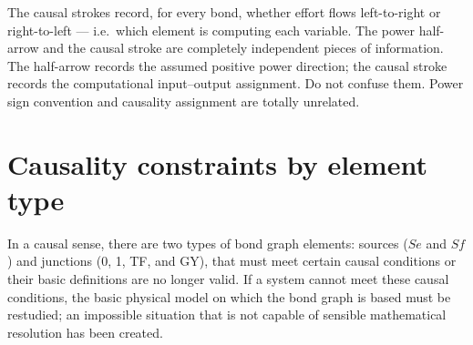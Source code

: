The causal strokes record, for every bond, whether effort flows left-to-right or right-to-left — i.e.\ which element is computing each variable. The power half-arrow and the causal stroke are completely independent pieces of information. The half-arrow records the assumed positive power direction; the causal stroke records the computational input--output assignment. Do not confuse them. Power sign convention and causality assignment are totally unrelated.

\section{Causality constraints by element type}

In a causal sense, there are two types of bond graph elements: sources ($Se$ and $Sf$) and junctions (0, 1, TF, and GY), that must meet certain causal conditions or their basic definitions are no longer valid. If a system cannot meet these causal conditions, the basic physical model on which the bond graph is based must be restudied; an impossible situation that is not capable of sensible mathematical resolution has been created.

